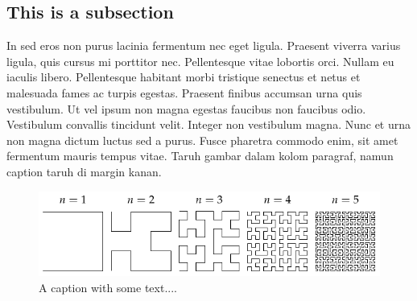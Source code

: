 \documentclass{article}
\begin{document}
\subsection{This is a subsection}
In sed eros non purus lacinia fermentum nec eget ligula. Praesent viverra varius ligula, quis cursus mi porttitor nec. Pellentesque vitae lobortis orci. Nullam eu iaculis libero. Pellentesque habitant morbi tristique senectus et netus et malesuada fames ac turpis egestas. Praesent finibus accumsan urna quis vestibulum. Ut vel ipsum non magna egestas faucibus non faucibus odio. Vestibulum convallis tincidunt velit. Integer non vestibulum magna. Nunc et urna non magna dictum luctus sed a purus. Fusce pharetra commodo enim, sit amet fermentum mauris tempus vitae. 
Taruh gambar dalam kolom paragraf, namun caption taruh di margin kanan.

\begin{figure}[!h]\centering
\includegraphics[scale = 1.08]{figures/hilbertcurves}
\caption{\footnotesize A caption with some text....}
\end{figure}
\end{document}
